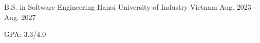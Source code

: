 \begin{cventries} %
  \cventry
    {B.S. in Software Engineering} %
    {Hanoi University of Industry} %
    {Vietnam} %
    {Aug. 2023 - Aug. 2027} %
    {
      \begin{cvitems} %
        \item {GPA: 3.3/4.0}
      \end{cvitems}
    }
\end{cventries}
